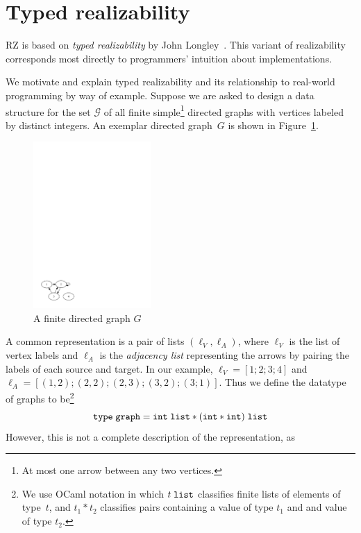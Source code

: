 \section{Typed realizability}
\label{sec:typed-realizability}

RZ is based on \emph{typed realizability} by John
Longley~\cite{Longley99}.   This variant of realizability corresponds most
directly to programmers' intuition about implementations.

We motivate and explain typed realizability and its relationship to
real-world programming by way of example. Suppose we are asked to
design a data structure for the set $\mathcal{G}$ of all finite
simple\footnote{At most one arrow between any two vertices.}
directed graphs with vertices labeled by distinct integers. An exemplar
directed graph~$G$ is shown in Figure~\ref{fig:digraph}.
%
\begin{figure}
  \centering
  \includegraphics[width=0.4\textwidth]{digraph}
  \caption{A finite directed graph $G$}
  \label{fig:digraph}
\end{figure}
%
A common representation is a pair of lists $(\ell_V, \ell_A)$, where
$\ell_V$ is the list of vertex labels and $\ell_A$ is the \emph{adjacency list} 
representing the arrows by pairing the labels of each source and target.
In our example, $\ell_V = [1; 2;
3; 4]$ and $\ell_A = [(1,2); (2,2); (2,3); (3,2); (3;1)]$. Thus we
define the datatype of graphs to be\footnote{We use OCaml notation in
  which $t\;\mathtt{list}$ classifies finite lists of elements of type~$t$, and
  $t_1 * t_2$ classifies pairs containing a value of type $t_1$ and and 
  value of type $t_2$.}
%
\begin{equation*}
  \mathtt{type}\; \mathtt{graph} = \mathtt{int}\;\mathtt{list} * (\mathtt{int} * \mathtt{int})\;\mathtt{list}
\end{equation*}
%
However, this is not a complete description of the representation, as

